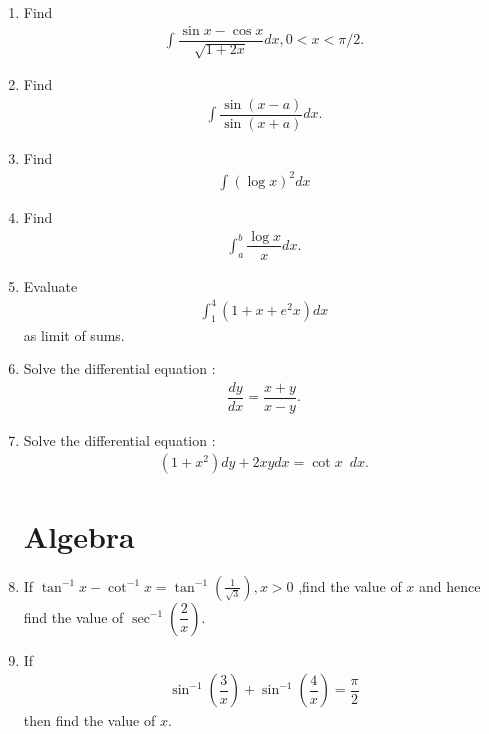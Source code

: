 \documentclass[12pt,-letter paper]{article}
\providecommand{\brak}[1]{\ensuremath{\left(#1\right)}}
\begin{document}
\begin{enumerate}
\item Find
\begin{align*}
    \int \dfrac{\sin x - \cos x}{\sqrt{1+2x}} dx , 0 < x < {\pi/2}.
    \end{align*}
    
    \item Find
    \begin{align*}
\int \dfrac{\sin \brak{x-a}}{\sin\brak{x+a}} dx.
    \end{align*}
    
\item Find 
\begin{align*}
    \int \brak{\log{x}}^2 dx
\end{align*}

\item Find
\begin{align*}
    \int_{a}^{b}\dfrac{\log{x}}{x}dx.
\end{align*}

\item Evaluate 
\begin{align*}
    \int_{1}^{4}\brak{1+x+e^2x}dx 
\end{align*}
as limit of sums.

\item Solve the differential equation :
\begin{align*}
    \dfrac{dy}{dx} = \dfrac{x+y}{x-y}.
\end{align*}

\item Solve the differential equation :
\begin{align*}
    \brak{1+x^{2}}dy + 2xy dx =\cot x\hspace{6pt} dx.
\end{align*}

\section{Algebra}

\item If $\tan^{-1}x-\cot^{-1}x =\tan^{-1}\brak{\frac{1}{ \sqrt3}}, x>0$ ,find the value of $x$ and hence find the value of $\sec^{-1}\left(\dfrac{2}{x}\right)$.

\item  If
\begin{align*}
 \sin^{-1} \brak{\dfrac{3}{x}} + \sin^{-1}\brak{\dfrac{4}{x}}=\dfrac{\pi}{2} 
\end{align*}
then find the value of $x$. 


\end{enumerate}
\end{document}
